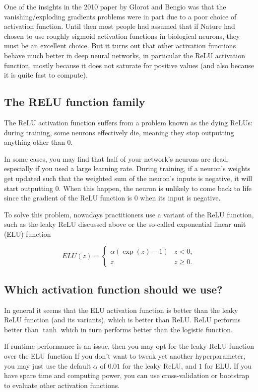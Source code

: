 \documentclass[%
oneside,                 %
final,                   %
10pt]{article}
\begin{document}
One of the insights in the 2010 paper by Glorot and Bengio was that
the vanishing/exploding gradients problems were in part due to a poor
choice of activation function. Until then most people had assumed that
if Nature had chosen to use roughly sigmoid activation functions in
biological neurons, they must be an excellent choice. But it turns out
that other activation functions behave much better in deep neural
networks, in particular the ReLU activation function, mostly because
it does not saturate for positive values (and also because it is quite
fast to compute).


\subsection*{The RELU function family}

The ReLU activation function suffers from a problem known as the dying
ReLUs: during training, some neurons effectively die, meaning they
stop outputting anything other than 0.

In some cases, you may find that half of your network’s neurons are
dead, especially if you used a large learning rate. During training,
if a neuron’s weights get updated such that the weighted sum of the
neuron’s inputs is negative, it will start outputting 0. When this
happen, the neuron is unlikely to come back to life since the gradient
of the ReLU function is 0 when its input is negative.

To solve this problem, nowadays practitioners use a  variant of the ReLU
function, such as the leaky ReLU discussed above or the so-called
exponential linear unit (ELU) function


\[
ELU(z) = \left\{\begin{array}{cc} \alpha\left( \exp{(z)}-1\right) & z < 0,\\  z & z \ge 0.\end{array}\right. 
\]

\subsection*{Which activation function should we use?}

In general it seems that the ELU activation function is better than
the leaky ReLU function (and its variants), which is better than
ReLU. ReLU performs better than $\tanh$ which in turn performs better
than the logistic function. 

If runtime
performance is an issue, then you may opt for the  leaky ReLU function  over the 
ELU function If you don’t
want to tweak yet another hyperparameter, you may just use the default
$\alpha$ of $0.01$ for the leaky ReLU, and $1$ for ELU. If you have
spare time and computing power, you can use cross-validation or
bootstrap to evaluate other activation functions.
\end{document}
